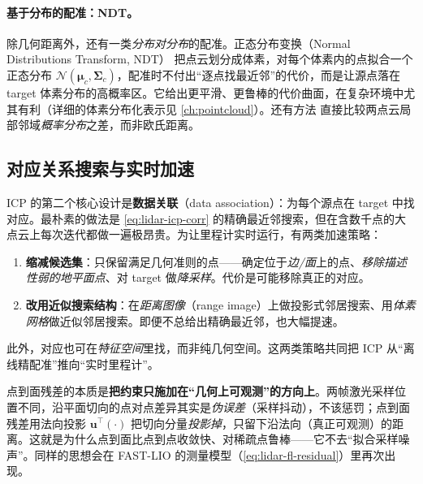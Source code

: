 \paragraph{基于分布的配准：NDT。}
除几何距离外，还有一类\emph{分布对分布}的配准。正态分布变换（Normal Distributions Transform, NDT）\cite{biber2003ndt} 把点云划分成体素，对每个体素内的点拟合一个正态分布 $\mathcal{N}(\boldsymbol{\mu}_c,\boldsymbol{\Sigma}_c)$，配准时不付出“逐点找最近邻”的代价，而是让源点落在 target 体素分布的高概率区。它给出更平滑、更鲁棒的代价曲面，在复杂环境中尤其有利（详细的体素分布化表示见 \cref{ch:pointcloud}）。还有方法\cite{magnusson2009ndt} 直接比较两点云局部邻域\emph{概率分布}之差，而非欧氏距离。

\subsection{对应关系搜索与实时加速}
\label{sec:lidar-corr}

ICP 的第二个核心设计是\textbf{数据关联}（data association）：为每个源点在 target 中找对应。最朴素的做法是 \cref{eq:lidar-icp-corr} 的精确最近邻搜索，但在含数千点的大点云上每次迭代都做一遍极昂贵。为让里程计实时运行，有两类加速策略\cite{carlone2026handbook}：
\begin{enumerate}
  \item \textbf{缩减候选集}：只保留满足几何准则的点——确定位于\emph{边/面}上的点\cite{zhang2014loam}、\emph{移除描述性弱的地平面点}\cite{shan2018legoloam}、对 target 做\emph{降采样}\cite{vizzo2023kissicp}。代价是可能移除真正的对应。
  \item \textbf{改用近似搜索结构}：在\emph{距离图像}（range image）上做投影式邻居搜索\cite{behley2018efficient}、用\emph{体素网格}做近似邻居搜索\cite{zhang2014loam}。即便不总给出精确最近邻，也大幅提速。
\end{enumerate}
此外，对应也可在\emph{特征空间}里找\cite{shan2018legoloam}，而非纯几何空间。这两类策略共同把 ICP 从“离线精配准”推向“实时里程计”。

\begin{insight}
点到面残差的本质是\textbf{把约束只施加在“几何上可观测”的方向上}。两帧激光采样位置不同，沿平面切向的点对点差异其实是\emph{伪误差}（采样抖动），不该惩罚；点到面残差用法向投影 $\mathbf{u}^\top(\cdot)$ 把切向分量\emph{投影掉}，只留下沿法向（真正可观测）的距离。这就是为什么点到面比点到点收敛快、对稀疏点鲁棒——它不去“拟合采样噪声”。同样的思想会在 FAST-LIO 的测量模型（\cref{eq:lidar-fl-residual}）里再次出现。
\end{insight}

